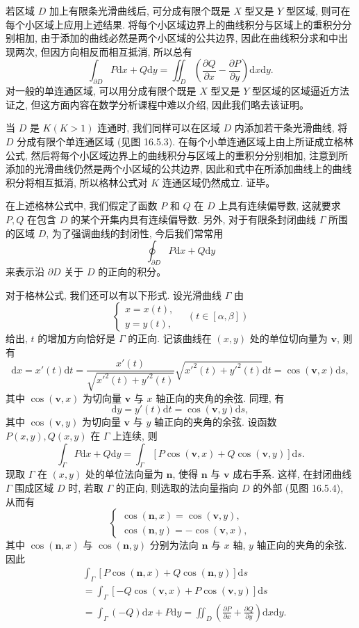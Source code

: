 \documentclass[UTF8,12pt,a4paper,fontset=fandol]{ctexart}
\begin{document}
若区域 $D$ 加上有限条光滑曲线后, 可分成有限个既是 $X$ 型又是 $Y$ 型区域, 则可在每个小区域上应用上述结果. 将每个小区域边界上的曲线积分与区域上的重积分分别相加, 由于添加的曲线必然是两个小区域的公共边界, 因此在曲线积分求和中出现两次, 但因方向相反而相互抵消, 所以总有
\[
  \int_{\partial D}P\mathrm dx+Q\mathrm dy
  =\iint_D\left(\frac{\partial Q}{\partial x}-\frac{\partial P}{\partial y}\right)\mathrm dx\mathrm dy.
\]
对一般的单连通区域, 可以用分成有限个既是 $X$ 型又是 $Y$ 型区域的区域逼近方法证之, 但这方面内容在数学分析课程中难以介绍, 因此我们略去该证明。

当 $D$ 是 $K(K>1)$ 连通时, 我们同样可以在区域 $D$ 内添加若干条光滑曲线, 将 $D$ 分成有限个单连通区域 (见图 16.5.3). 在每个小单连通区域上由上所证成立格林公式, 然后将每个小区域边界上的曲线积分与区域上的重积分分别相加, 注意到所添加的光滑曲线仍然是两个小区域的公共边界, 因此和式中在所添加曲线上的曲线积分将相互抵消, 所以格林公式对 $K$ 连通区域仍然成立. 证毕。

在上述格林公式中, 我们假定了函数 $P$ 和 $Q$ 在 $D$ 上具有连续偏导数, 这就要求 $P,Q$ 在包含 $D$ 的某个开集内具有连续偏导数. 另外, 对于有限条封闭曲线 $\Gamma$ 所围的区域 $D$, 为了强调曲线的封闭性, 今后我们常常用
\[
  \oint_{\partial D}P\mathrm dx+Q\mathrm dy
\]
来表示沿 $\partial D$ 关于 $D$ 的正向的积分。

对于格林公式, 我们还可以有以下形式. 设光滑曲线 $\Gamma$ 由
\[
  \begin{cases}
    x=x(t),\\
    y=y(t),
  \end{cases}\quad (t\in[\alpha,\beta])
\]
给出, $t$ 的增加方向恰好是 $\Gamma$ 的正向. 记该曲线在 $(x,y)$ 处的单位切向量为 $\boldsymbol v$, 则有
\[
  \mathrm dx=x'(t)\mathrm dt
  =\frac{x'(t)}{\sqrt{x'^2(t)+y'^2(t)}}\sqrt{x'^2(t)+y'^2(t)}\mathrm dt
  =\cos(\boldsymbol v,x)\mathrm ds,
\]
其中 $\cos(\boldsymbol v,x)$ 为切向量 $\boldsymbol v$ 与 $x$ 轴正向的夹角的余弦. 同理, 有
\[
  \mathrm dy=y'(t)\mathrm dt=\cos(\boldsymbol v,y)\mathrm ds,
\]
其中 $\cos(\boldsymbol v,y)$ 为切向量 $\boldsymbol v$ 与 $y$ 轴正向的夹角的余弦. 设函数 $P(x,y),Q(x,y)$ 在 $\Gamma$ 上连续, 则
\[
  \int_\Gamma P\mathrm dx+Q\mathrm dy
  =\int_\Gamma[P\cos(\boldsymbol v,x)+Q\cos(\boldsymbol v,y)]\mathrm ds.
\]
现取 $\Gamma$ 在 $(x,y)$ 处的单位法向量为 $\boldsymbol n$, 使得 $\boldsymbol n$ 与 $\boldsymbol v$ 成右手系. 这样, 在封闭曲线 $\Gamma$ 围成区域 $D$ 时, 若取 $\Gamma$ 的正向, 则选取的法向量指向 $D$ 的外部 (见图 16.5.4), 从而有
\[
  \begin{cases}
    \cos(\boldsymbol n,x)=\cos(\boldsymbol v,y),\\
    \cos(\boldsymbol n,y)=-\cos(\boldsymbol v,x),
  \end{cases}
\]
其中 $\cos(\boldsymbol n,x)$ 与 $\cos(\boldsymbol n,y)$ 分别为法向 $\boldsymbol n$ 与 $x$ 轴, $y$ 轴正向的夹角的余弦. 因此
\[
\begin{aligned}
  &\int_\Gamma[P\cos(\boldsymbol n,x)+Q\cos(\boldsymbol n,y)]\mathrm ds\\
  &=\int_\Gamma[-Q\cos(\boldsymbol v,x)+P\cos(\boldsymbol v,y)]\mathrm ds\\
  &=\int_\Gamma(-Q)\mathrm dx+P\mathrm dy
  =\iint_D\left(\frac{\partial P}{\partial x}+\frac{\partial Q}{\partial y}\right)\mathrm dx\mathrm dy.
\end{aligned}
\]
\end{document}
